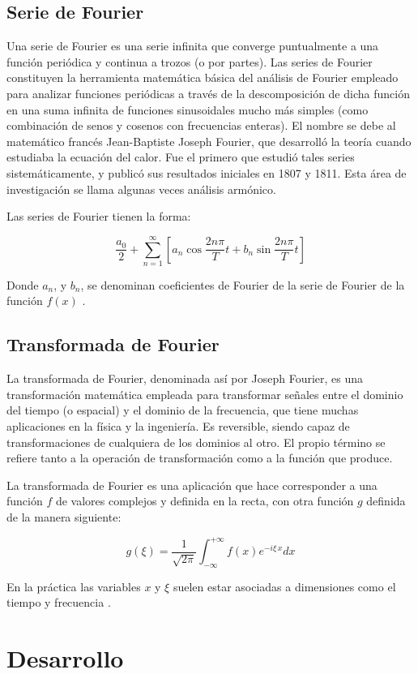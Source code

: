 \documentclass[comsoc, journal]{IEEEtran}
\begin{document}
\subsection{Serie de Fourier}
Una serie de Fourier es una serie infinita que converge puntualmente a una función periódica y continua a trozos (o por partes). Las series de Fourier constituyen la herramienta matemática básica del análisis de Fourier empleado para analizar funciones periódicas a través de la descomposición de dicha función en una suma infinita de funciones sinusoidales mucho más simples (como combinación de senos y cosenos con frecuencias enteras). El nombre se debe al matemático francés Jean-Baptiste Joseph Fourier, que desarrolló la teoría cuando estudiaba la ecuación del calor. Fue el primero que estudió tales series sistemáticamente, y publicó sus resultados iniciales en 1807 y 1811. Esta área de investigación se llama algunas veces análisis armónico.

Las series de Fourier tienen la forma:

$$\frac{a_0}{2} + \sum_{n=1}^\infty\left[a_n\cos\frac{2n\pi}{T}t + b_n\sin\frac{2n\pi}{T}t\right]$$

Donde $a_n$, y $b_n$, se denominan coeficientes de Fourier de la serie de Fourier de la función $f(x)$ \cite{spiegel}.

\subsection{Transformada de Fourier}
La transformada de Fourier, denominada así por Joseph Fourier, es una transformación matemática empleada para transformar señales entre el dominio del tiempo (o espacial) y el dominio de la frecuencia, que tiene muchas aplicaciones en la física y la ingeniería. Es reversible, siendo capaz de transformaciones de cualquiera de los dominios al otro. El propio término se refiere tanto a la operación de transformación como a la función que produce.

La transformada de Fourier es una aplicación que hace corresponder a una función $f$ de valores complejos y definida en la recta, con otra función $g$ definida de la manera siguiente:

$$g(\xi ) =  \frac{1}{\sqrt{2\pi}}\int_{-\infty}^{+\infty} f(x)e^{-i\xi\,x} dx$$

En la práctica las variables $x$ y $\xi$ suelen estar asociadas a dimensiones como el tiempo y frecuencia \cite{spiegel}.

\section{Desarrollo}
\end{document}
